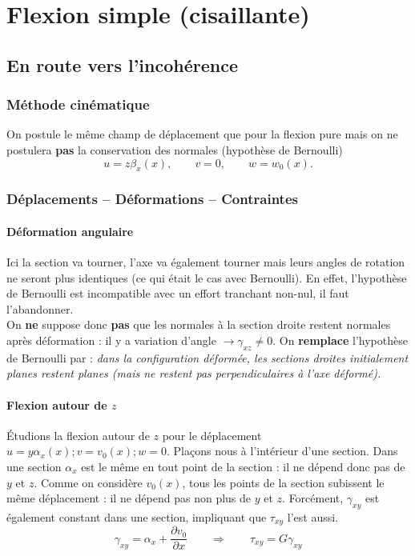 \chapter{Flexion simple (cisaillante)}
\section{En route vers l'incohérence}
	\subsection{Méthode cinématique}
	On postule le même	champ de déplacement que pour la flexion pure mais
	on ne postulera \textbf{pas} la conservation des normales (hypothèse 
	de Bernoulli)	
	\begin{equation}
	u=z\beta_x(x),\qquad v=0,\qquad w=w_0(x).
	\end{equation}
	
	\subsection{Déplacements – Déformations – Contraintes}
		\subsubsection{Déformation angulaire}
		Ici la section va tourner, l'axe va également tourner mais leurs 
		angles de rotation ne seront plus identiques (ce qui était le cas 
		avec Bernoulli). En effet, l'hypothèse de Bernoulli est incompatible 
		avec un effort tranchant non-nul, il faut l'abandonner.\\
		
		On \textbf{ne} suppose donc \textbf{pas} que les normales à la 
		section droite restent normales après déformation : il y a variation 
		d'angle $\rightarrow \gamma_{xz} \neq 0$.
		On \textbf{remplace} l'hypothèse de Bernoulli par : \textit{dans la 
		configuration déformée, les sections droites initialement planes 
		restent planes (mais ne restent pas perpendiculaires à l'axe déformé).}
		
		\subsubsection{Flexion autour de $z$}
		Étudions la flexion autour de $z$ pour le déplacement $u=y\alpha_x(x); 
		v=v_0(x);w=0$. Plaçons nous à l'intérieur d'une section. Dans une 
		section $\alpha_x$ est le même en tout point de la section : il ne 
		dépend donc pas de $y$ et $z$. Comme on considère $v_0(x)$, tous les 
		points de la section subissent le même déplacement : il ne dépend pas 
		non plus de $y$ et $z$. Forcément, $\gamma_{xy}$ est également 
		constant dans une section, impliquant que $\tau_{xy}$ l'est aussi.
		\begin{equation}
		\gamma_{xy} = \alpha_x + \dfrac{\partial v_0}{\partial x}\qquad
		\Longrightarrow\qquad \tau_{xy} = G\gamma_{xy}
		\end{equation}
		
